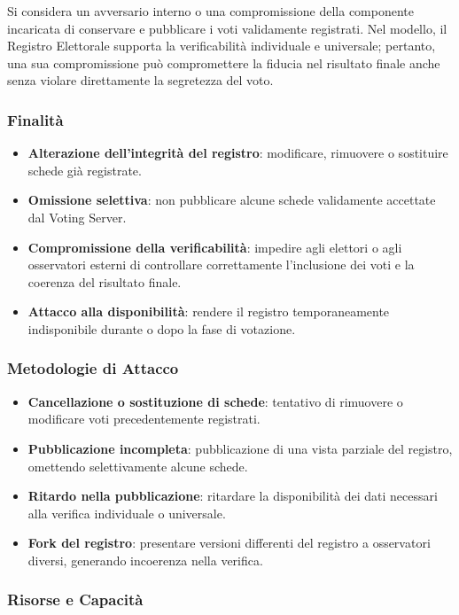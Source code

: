 \documentclass[a4paper,12pt]{article}
\begin{document}
Si considera un avversario interno o una compromissione della componente incaricata di conservare e pubblicare i voti validamente registrati. Nel modello, il Registro Elettorale supporta la verificabilità individuale e universale; pertanto, una sua compromissione può compromettere la fiducia nel risultato finale anche senza violare direttamente la segretezza del voto.

\subsubsection*{Finalità}

\begin{itemize}
    \item \textbf{Alterazione dell'integrità del registro}: modificare, rimuovere o sostituire schede già registrate.
    \item \textbf{Omissione selettiva}: non pubblicare alcune schede validamente accettate dal Voting Server.
    \item \textbf{Compromissione della verificabilità}: impedire agli elettori o agli osservatori esterni di controllare correttamente l'inclusione dei voti e la coerenza del risultato finale.
    \item \textbf{Attacco alla disponibilità}: rendere il registro temporaneamente indisponibile durante o dopo la fase di votazione.
\end{itemize}

\subsubsection*{Metodologie di Attacco}

\begin{itemize}
    \item \textbf{Cancellazione o sostituzione di schede}: tentativo di rimuovere o modificare voti precedentemente registrati.
    \item \textbf{Pubblicazione incompleta}: pubblicazione di una vista parziale del registro, omettendo selettivamente alcune schede.
    \item \textbf{Ritardo nella pubblicazione}: ritardare la disponibilità dei dati necessari alla verifica individuale o universale.
    \item \textbf{Fork del registro}: presentare versioni differenti del registro a osservatori diversi, generando incoerenza nella verifica.
\end{itemize}

\subsubsection*{Risorse e Capacità}
\end{document}
